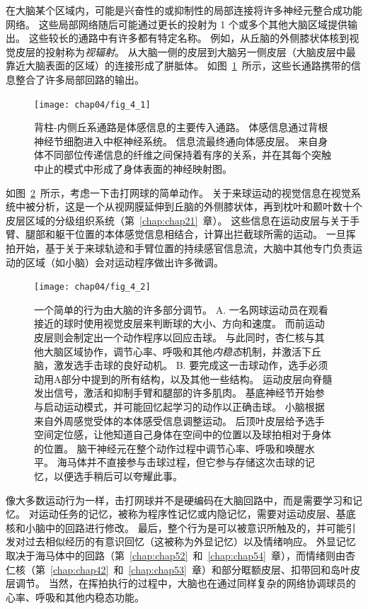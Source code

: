 在大脑某个区域内，可能是兴奋性的或抑制性的局部连接将许多神经元整合成功能网络。
这些局部网络随后可能通过更长的投射为 1 个或多个其他大脑区域提供输出。
这些较长的通路中有许多都有特定名称。
例如，从丘脑的外侧膝状体核到视觉皮层的投射称为\textit{视辐射}。
从大脑一侧的皮层到大脑另一侧皮层（大脑皮层中最靠近大脑表面的区域）的连接形成了胼胝体。
如图~\ref{fig:4_1}~所示，这些长通路携带的信息整合了许多局部回路的输出。


\begin{figure}[htbp]
	\centering
	\texttt{[image: chap04/fig\_4\_1]}
	\caption{背柱-内侧丘系通路是体感信息的主要传入通路。 
		体感信息通过背根神经节细胞进入中枢神经系统。
		信息流最终通向体感皮层。
		来自身体不同部位传递信息的纤维之间保持着有序的关系，并在其每个突触中止的模式中形成了身体表面的神经映射图。}
	\label{fig:4_1}
\end{figure}


如图~\ref{fig:4_2}~所示，考虑一下击打网球的简单动作。
关于来球运动的视觉信息在视觉系统中被分析，这是一个从视网膜延伸到丘脑的外侧膝状体，再到枕叶和颞叶数十个皮层区域的分级组织系统（第~\ref{chap:chap21}~章）。
这些信息在运动皮层与关于手臂、腿部和躯干位置的本体感觉信息相结合，计算出拦截球所需的运动。 
一旦挥拍开始，基于关于来球轨迹和手臂位置的持续感官信息流，大脑中其他专门负责运动的区域（如小脑）会对运动程序做出许多微调。


\begin{figure}[htbp]
	\centering
	\texttt{[image: chap04/fig\_4\_2]}
	\caption{一个简单的行为由大脑的许多部分调节。
		A. 一名网球运动员在观看接近的球时使用视觉皮层来判断球的大小、方向和速度。
		而前运动皮层则会制定出一个动作程序以回应击球。
		与此同时，杏仁核与其他大脑区域协作，调节心率、呼吸和其他\textit{内稳态}机制，并激活下丘脑，激发选手击球的良好动机。 
		B. 要完成这一击球动作，选手必须动用A部分中提到的所有结构，以及其他一些结构。
		运动皮层向脊髓发出信号，激活和抑制手臂和腿部的许多肌肉。
		基底神经节开始参与启动运动模式，并可能回忆起学习的动作以正确击球。
		小脑根据来自外周感觉受体的本体感受信息调整运动。
		后顶叶皮层给予选手空间定位感，让他知道自己身体在空间中的位置以及球拍相对于身体的位置。
		脑干神经元在整个动作过程中调节心率、呼吸和唤醒水平。
		海马体并不直接参与击球过程，但它参与存储这次击球的记忆，以便选手稍后可以夸耀此事。}
	\label{fig:4_2}
\end{figure}


像大多数运动行为一样，击打网球并不是硬编码在大脑回路中，而是需要学习和记忆。
对运动任务的记忆，被称为程序性记忆或内隐记忆，需要对运动皮层、基底核和小脑中的回路进行修改。
最后，整个行为是可以被意识所触及的，并可能引发对过去相似经历的有意识回忆（这被称为外显记忆）以及情绪响应。
外显记忆取决于海马体中的回路（第~\ref{chap:chap52}~和~\ref{chap:chap54}~章），而情绪则由杏仁核（第~\ref{chap:chap42}~和~\ref{chap:chap53}~章）和部分眶额皮层、扣带回和岛叶皮层调节。
当然，在挥拍执行的过程中，大脑也在通过同样复杂的网络协调球员的心率、呼吸和其他内稳态功能。



